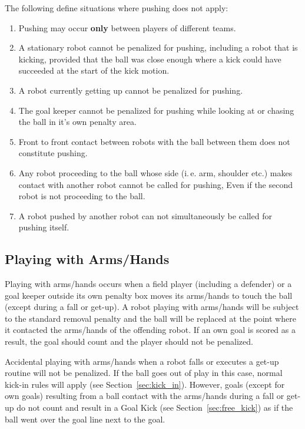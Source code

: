 \documentclass[12pt]{article}
\newcommand{\ie}{\mbox{i.\,e.}\xspace}
\newcommand{\cf}{see\xspace}
\begin{document}
The following define situations where pushing does not apply:

\begin{enumerate}
  \item Pushing may occur \textbf{only} between players of different teams.
  \item A stationary robot cannot be penalized for pushing, including a robot that is kicking, provided that the ball was close enough where a kick could have succeeded at the start of the kick motion.
  \item A robot currently getting up cannot be penalized for pushing.
  \item The goal keeper cannot be penalized for pushing while looking at or chasing the ball in it's own penalty area.
  \item Front to front contact between robots with the ball between them does not constitute pushing.
  \item Any robot proceeding to the ball whose side (\ie arm, shoulder etc.) makes contact with another robot cannot be called for pushing, Even if the second robot is not proceeding to the ball.
  \item A robot pushed by another robot can not simultaneously be called for pushing itself.
\end{enumerate}

\subsection{Playing with Arms/Hands}
\label{sec:hand_ball}

Playing with arms/hands occurs when a field player (including a defender) or a goal keeper outside its own penalty box moves its arms/hands to touch the ball (except during a fall or get-up). A robot playing with arms/hands will be subject to the standard removal penalty and the ball will be replaced at the point where it contacted the arms/hands of the offending robot.  If an own goal is scored as a result, the goal should count and the player should not be penalized.

Accidental playing with arms/hands when a robot falls or executes a get-up routine will not be penalized. If the ball goes out of play in this case, normal kick-in rules will apply (\cf Section~\ref{sec:kick_in}). However, goals (except for own goals) resulting from a ball contact with the arms/hands during a fall or get-up do not count and result in a Goal Kick (\cf Section~\ref{sec:free_kick}) as if the ball went over the goal line next to the goal.
\end{document}
